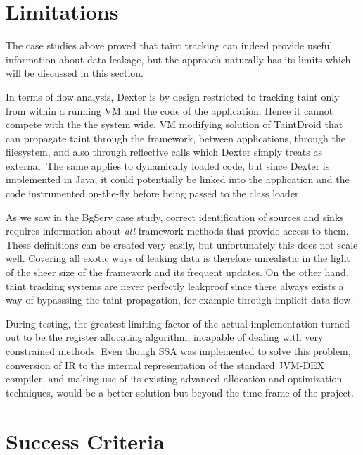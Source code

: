 \documentclass[12pt,twoside,notitlepage]{report}
\begin{document}
\section{Limitations}

The case studies above proved that taint tracking can indeed provide useful information about data leakage, but the approach naturally has its limits which will be discussed in this section. 

In terms of flow analysis, Dexter is by design restricted to tracking taint only from within a running VM and the code of the application. Hence it cannot compete with the the system wide, VM modifying solution of TaintDroid that can propagate taint through the framework, between applications, through the filesystem, and also through reflective calls which Dexter simply treats as external. The same applies to dynamically loaded code, but since Dexter is implemented in Java, it could potentially be linked into the application and the code instrumented on-the-fly before being passed to the class loader.

As we saw in the BgServ case study, correct identification of sources and sinks requires information about \emph{all} framework methods that provide access to them. These definitions can be created very easily, but unfortunately this does not scale well. Covering all exotic ways of leaking data is therefore unrealistic in the light of the sheer size of the framework and its frequent updates. On the other hand, taint tracking systems are never perfectly leakproof since there always exists a way of bypasssing the taint propagation, for example through implicit data flow.

During testing, the greatest limiting factor of the actual implementation turned out to be the register allocating algorithm, incapable of dealing with very constrained methods. Even though SSA was implemented to solve this problem, conversion of IR to the internal representation of the standard JVM-DEX compiler, and making use of its existing advanced allocation and optimization techniques, would be a better solution but beyond the time frame of the project.

\section{Success Criteria}
\end{document}
